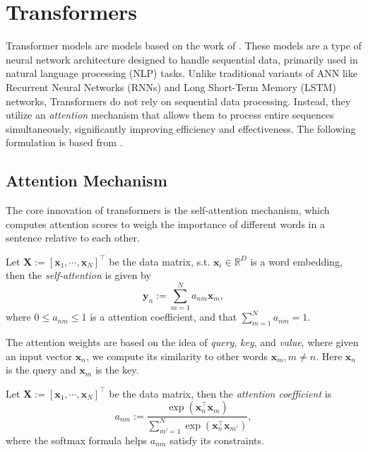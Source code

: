 \section{Transformers}\label{sec:transformers}
Transformer models are models based on the work of \cite{vaswani2017attention}. These models are a type of neural network architecture designed to handle sequential data, primarily used in natural language processing (NLP) tasks. Unlike traditional variants of ANN like Recurrent Neural Networks (RNNs) and Long Short-Term Memory (LSTM) networks, Transformers do not rely on sequential data processing. Instead, they utilize an \textit{attention} mechanism that allows them to process entire sequences simultaneously, significantly improving efficiency and effectiveness. The following formulation is based from \cite{bishop2023learning}.

\subsection{Attention Mechanism}\label{sec:attention-mechanism}
The core innovation of transformers is the self-attention mechanism, which computes attention scores to weigh the importance of different words in a sentence relative to each other. 

\begin{defn}\label{defn:vec-self-attention}
    Let $\mathbf{X}:=[\mathbf{x}_1,\cdots,\mathbf{x}_N]^{\top}$ be the data matrix, s.t. $\mathbf{x}_i\in\mathbb{R}^{D}$ is a word embedding, then the \textit{self-attention} is given by
    \begin{equation}\label{eq:self-attention}
        \mathbf{y}_n := \sum_{m=1}^{N}a_{nm}\mathbf{x}_m,
    \end{equation}
    where $0\leq a_{nm}\leq 1$ is a attention coefficient, and that $\sum_{m=1}^{N}a_{nm}=1$.
\end{defn}

The attention weights are based on the idea of \textit{query}, \textit{key}, and \textit{value}, where given an input vector $\mathbf{x}_n$, we compute its similarity to other words $\mathbf{x}_m,m\neq n$. Here $\mathbf{x}_n$ is the query and $\mathbf{x}_m$ is the key.

\begin{defn}
    Let $\mathbf{X}:=[\mathbf{x}_1,\cdots,\mathbf{x}_N]^{\top}$ be the data matrix, then the \textit{attention coefficient} is
    \begin{equation}
        a_{nm}:=\frac{\exp(\mathbf{x}_n^{\top}\mathbf{x}_m)}{\displaystyle\sum_{m'=1}^{N}\exp(\mathbf{x}_n^{\top}\mathbf{x}_{m'})},
    \end{equation}
    where the softmax formula helps $a_{nm}$ satisfy its constraints.
\end{defn}

